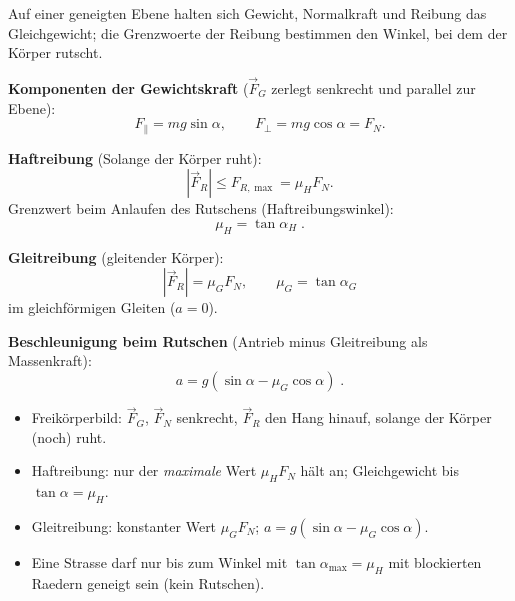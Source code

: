 

Auf einer geneigten Ebene halten sich Gewicht, Normalkraft und Reibung
das Gleichgewicht; die Grenzwoerte der Reibung bestimmen den Winkel, bei
dem der Körper rutscht.

\begin{werkzeugkasten}[Werkzeuge]
\textbf{Komponenten der Gewichtskraft} ($\vec F_G$ zerlegt senkrecht und
parallel zur Ebene):
\begin{equation}
  F_\parallel=mg\sin\alpha,\qquad
  F_\perp=mg\cos\alpha=F_N.
\end{equation}

\textbf{Haftreibung} (Solange der Körper ruht):
\begin{equation}
  |\vec F_R|\le F_{R,\max}=\mu_H F_N.
\end{equation}
Grenzwert beim Anlaufen des Rutschens (Haftreibungswinkel):
\begin{equation}
  \mu_H=\tan\alpha_H\;.
\end{equation}

\textbf{Gleitreibung} (gleitender Körper):
\begin{equation}
  |\vec F_R|=\mu_G F_N,\qquad\mu_G=\tan\alpha_G
\end{equation}
im gleichförmigen Gleiten ($a=0$).

\textbf{Beschleunigung beim Rutschen} (Antrieb minus Gleitreibung als
Massenkraft):
\begin{equation}
  a=g(\sin\alpha-\mu_G\cos\alpha)\;.
\end{equation}
\end{werkzeugkasten}

\begin{werkzeugkasten}[Vorgehen]
\begin{itemize}
  \item Freikörperbild: $\vec F_G$, $\vec F_N$ senkrecht, $\vec F_R$ den
        Hang hinauf, solange der Körper (noch) ruht.
  \item Haftreibung: nur der \emph{maximale} Wert $\mu_H F_N$ hält an;
        Gleichgewicht bis $\tan\alpha=\mu_H$.
  \item Gleitreibung: konstanter Wert $\mu_GF_N$; $a=g(\sin\alpha-\mu_G\cos\alpha)$.
  \item Eine Strasse darf nur bis zum Winkel mit $\tan\alpha_{\max}=\mu_H$
        mit blockierten Raedern geneigt sein (kein Rutschen).
\end{itemize}
\end{werkzeugkasten}


